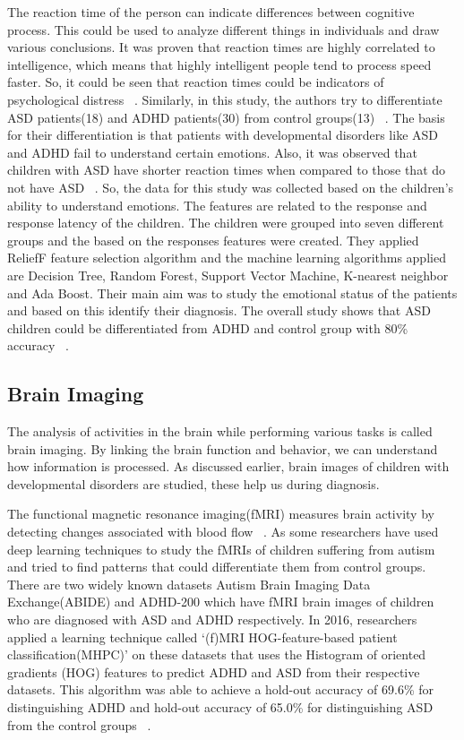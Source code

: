 The reaction time of the person can indicate differences between cognitive process. This could be used to analyze different things in individuals and draw various conclusions. It was proven that reaction times are highly correlated to intelligence, which means that highly intelligent people tend to process speed faster. So, it could be seen that reaction times could be indicators of psychological distress ~\cite{deary2001reaction}. Similarly, in this study, the authors try to differentiate ASD patients(18) and ADHD patients(30) from control groups(13) ~\cite{uluyagmur2016adhd}. The basis for their differentiation is that patients with developmental disorders like ASD and ADHD fail to understand certain emotions. Also, it was observed that children with ASD have shorter reaction times when compared to those that do not have ASD ~\cite{baisch2017reaction}. So, the data for this study was collected based on the children’s ability to understand emotions. The features are related to the response and response latency of the children. The children were grouped into seven different groups and the based on the responses features were created. They applied ReliefF feature selection algorithm and the machine learning algorithms applied are Decision Tree, Random Forest, Support Vector Machine, K-nearest neighbor and Ada Boost. Their main aim was to study the emotional status of the patients and based on this identify their diagnosis. The overall study shows that ASD children could be differentiated from ADHD and control group with 80\% accuracy ~\cite{uluyagmur2016adhd}.

\subsection{Brain Imaging}
The analysis of activities in the brain while performing various tasks is called brain imaging. By linking the brain function and behavior, we can understand how information is processed. As discussed earlier, brain images of children with developmental disorders are studied, these help us during diagnosis.

The functional magnetic resonance imaging(fMRI) measures brain activity by detecting changes associated with blood flow ~\cite{rinck2014magnetic}. As some researchers have used deep learning techniques to study the fMRIs of children suffering from autism and tried to find patterns that could differentiate them from control groups. There are two widely known datasets Autism Brain Imaging Data Exchange(ABIDE) and ADHD-200 which have fMRI brain images of children who are diagnosed with ASD and ADHD respectively. In 2016, researchers applied a learning technique called `(f)MRI HOG-feature-based patient classification(MHPC)' on these datasets that uses the Histogram of oriented gradients (HOG) features to predict ADHD and ASD from their respective datasets. This algorithm was able to achieve a hold-out accuracy of 69.6\% for distinguishing ADHD and hold-out accuracy of 65.0\% for distinguishing ASD from the control groups ~\cite{ghiassian2016using}.


